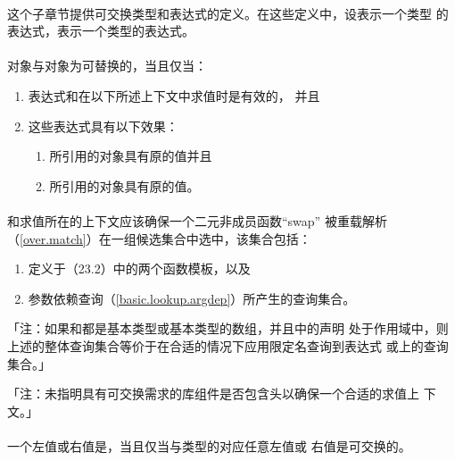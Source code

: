 \paragraph{}
这个子章节提供可交换类型和表达式的定义。在这些定义中，设表示一个类型
的表达式，表示一个类型的表达式。

\paragraph{}
对象与对象为可替换的，当且仅当：
\begin{enumerate}
  \item{表达式和在以下所述上下文中求值时是有效的，
    并且}
  \item{这些表达式具有以下效果：
    \begin{enumerate}
      \item{所引用的对象具有原的值并且}
      \item{所引用的对象具有原的值。}
    \end{enumerate}}
\end{enumerate}

\paragraph{}
和求值所在的上下文应该确保一个二元非成员函数“swap”
被重载解析（\ref{over.match}）在一组候选集合中选中，该集合包括：
\begin{enumerate}
  \item{定义于（23.2）中的两个函数模板，以及}
  \item{参数依赖查询（\ref{basic.lookup.argdep}）所产生的查询集合。}
\end{enumerate}
「注：如果和都是基本类型或基本类型的数组，并且中的声明
处于作用域中，则上述的整体查询集合等价于在合适的情况下应用限定名查询到表达式
或上的查询集合。」

「注：未指明具有可交换需求的库组件是否包含头以确保一个合适的求值上
下文。」

\paragraph{}
一个左值或右值是，当且仅当与类型的对应任意左值或
右值是可交换的。

